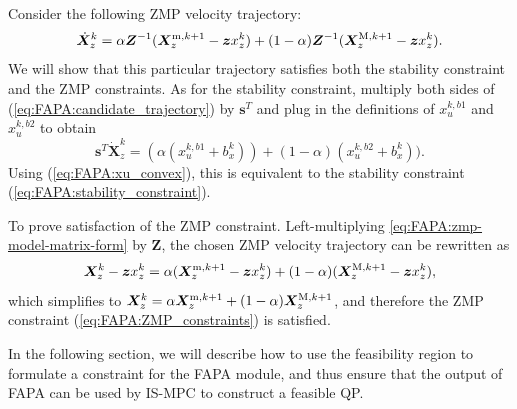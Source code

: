 Consider the following ZMP velocity trajectory:
\begin{equation}\label{eq:FAPA:candidate_trajectory}
\dot{\bm{X}}_z^k = \alpha \bm{Z}^{-1}(\bm{X}_z^{{\rm m}, k+1} - \bm{z} x_z^k) + (1-\alpha)\bm{Z}^{-1}(\bm{X}_z^{{\rm M}, k+1} - \bm{z} x_z^k).
\end{equation}
We will show that this particular trajectory satisfies both the stability constraint and the ZMP constraints. As for the stability constraint, multiply both sides of (\ref{eq:FAPA:candidate_trajectory}) by $\bm{s}^T$
and plug in the definitions of $x_u^{k,b1}$ and $x_u^{k,b2}$ to obtain
\begin{equation*}
\bm{s}^T\dot{\bm X}_z^k = (\alpha (x_u^{k,b1} + b^k_x)) + (1-\alpha)(x_u^{k,b2} + b^k_x)).
\end{equation*}
Using (\ref{eq:FAPA:xu_convex}), this is equivalent to the stability constraint (\ref{eq:FAPA:stability_constraint}).

To prove satisfaction of the ZMP constraint. Left-multiplying \eqref{eq:FAPA:zmp-model-matrix-form} by $\bm{Z}$, the chosen ZMP velocity trajectory can be rewritten as
\begin{equation*}
\bm{X}_z^k - \bm{z} x_z^k = \alpha (\bm{X}_z^{{\rm m}, k+1} - \bm{z} x_z^k) + (1-\alpha)(\bm{X}_z^{{\rm M}, k+1} - \bm{z} x_z^k),
\end{equation*}
which simplifies to
$\bm{X}_z^k = \alpha \bm{X}_z^{{\rm m}, k+1} + (1-\alpha)\bm{X}_z^{{\rm M}, k+1}$,
and therefore the ZMP constraint (\ref{eq:FAPA:ZMP_constraints}) is satisfied. \hfill\bull

In the following section, we will describe how to use the feasibility region to formulate a constraint for the FAPA module, and thus ensure that the output of FAPA can be used by IS-MPC to construct a feasible QP.
